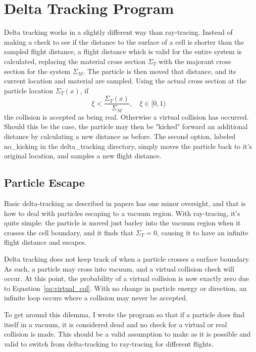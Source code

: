 \documentclass{article}
\begin{document}
	\section{Delta Tracking Program}
	Delta tracking works in a slightly different way than ray-tracing. Instead of making a check to see if the distance to the surface of a cell is shorter than the sampled flight distance, a flight distance which is valid for the entire system is calculated, replacing the material cross section $\Sigma_T$ with the majorant cross section for the system $\Sigma_M$. The particle is then moved that distance, and its current location and material are sampled. Using the actual cross section at the particle location $\Sigma_T(x)$, if
	\begin{equation}
		\xi < \frac{\Sigma_T(x)}{\Sigma_M}, \quad \xi \in [0,1)
		\label{eq:virtual_col}
	\end{equation}
	the collision is accepted as being real. Otherwise a virtual collision has occurred. Should this be the case, the particle may then be "kicked" forward an additional distance by calculating a new distance as before. The second option, labeled no\_kicking in the delta\_tracking directory, simply moves the particle back to it's original location, and samples a new flight distance.
	
	\subsection{Particle Escape}
	Basic delta-tracking as described in papers has one minor oversight, and that is how to deal with particles escaping to a vacuum region. With ray-tracing, it's quite simple: the particle is moved just barley into the vacuum region when it crosses the cell boundary, and it finds that $\Sigma_T=0$, causing it to have an infinite flight distance and escapes.
	
	Delta tracking does not keep track of when a particle crosses a surface boundary. As such, a particle may cross into vacuum, and a virtual collision check will occur. At this point, the probability of a virtual collision is now exactly zero due to Equation~\ref{eq:virtual_col}. With no change in particle energy or direction, an infinite loop occurs where a collision may never be accepted.
	
	To get around this dilemma, I wrote the program so that if a particle does find itself in a vacuum, it is considered dead and no check for a virtual or real collision is made. This should be a valid assumption to make as it is possible and valid to switch from delta-tracking to ray-tracing for different flights.
	
\end{document}
